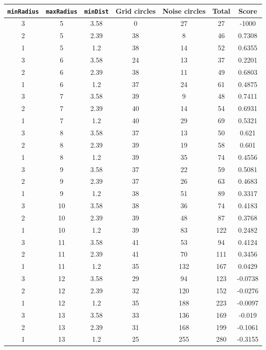 \documentclass[letterpaper, 12pt]{article}
\begin{document}
\begin{longtable}{|c|c|c|c|c|c|c|}
\hline
\textbf{\texttt{minRadius}} & \textbf{\texttt{maxRadius}} & \textbf{\texttt{minDist}} & \textbf{Grid circles} & \textbf{Noise circles} & \textbf{Total} & \textbf{Score} \\
\hline
3 & 5 & 3.58 & 0 & 27 & 27 & -1000 \\
\hline
2 & 5 & 2.39 & 38 & 8 & 46 & 0.7308 \\
\hline
1 & 5 & 1.2 & 38 & 14 & 52 & 0.6355 \\
\hline
3 & 6 & 3.58 & 24 & 13 & 37 & 0.2201 \\
\hline
2 & 6 & 2.39 & 38 & 11 & 49 & 0.6803 \\
\hline
1 & 6 & 1.2 & 37 & 24 & 61 & 0.4875 \\
\hline
3 & 7 & 3.58 & 39 & 9 & 48 & 0.7411 \\
\hline
2 & 7 & 2.39 & 40 & 14 & 54 & 0.6931 \\
\hline
1 & 7 & 1.2 & 40 & 29 & 69 & 0.5321 \\
\hline
3 & 8 & 3.58 & 37 & 13 & 50 & 0.621 \\
\hline
2 & 8 & 2.39 & 39 & 19 & 58 & 0.601 \\
\hline
1 & 8 & 1.2 & 39 & 35 & 74 & 0.4556 \\
\hline
3 & 9 & 3.58 & 37 & 22 & 59 & 0.5081 \\
\hline
2 & 9 & 2.39 & 37 & 26 & 63 & 0.4683 \\
\hline
1 & 9 & 1.2 & 38 & 51 & 89 & 0.3317 \\
\hline
3 & 10 & 3.58 & 38 & 36 & 74 & 0.4183 \\
\hline
2 & 10 & 2.39 & 39 & 48 & 87 & 0.3768 \\
\hline
1 & 10 & 1.2 & 39 & 83 & 122 & 0.2482 \\
\hline
3 & 11 & 3.58 & 41 & 53 & 94 & 0.4124 \\
\hline
2 & 11 & 2.39 & 41 & 70 & 111 & 0.3456 \\
\hline
1 & 11 & 1.2 & 35 & 132 & 167 & 0.0429 \\
\hline
3 & 12 & 3.58 & 29 & 94 & 123 & -0.0738 \\
\hline
2 & 12 & 2.39 & 32 & 120 & 152 & -0.0276 \\
\hline
1 & 12 & 1.2 & 35 & 188 & 223 & -0.0097 \\
\hline
3 & 13 & 3.58 & 33 & 136 & 169 & -0.019 \\
\hline
2 & 13 & 2.39 & 31 & 168 & 199 & -0.1061 \\
\hline
1 & 13 & 1.2 & 25 & 255 & 280 & -0.3155 \\

\end{longtable}
\end{document}
